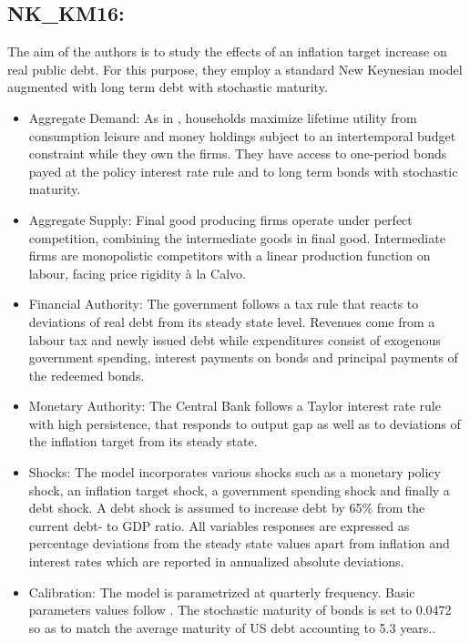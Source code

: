 \documentclass[11pt,a4paper]{article}
\begin{document}
	
	
	\subsection{NK\_KM16: \texorpdfstring{\cite{krause2016public}}{Krause and Moyen (2016)}}
	\label{NKKM16}
	The aim of the authors is to study the effects of an inflation target increase on real public debt. For this purpose, they employ a standard New Keynesian model augmented with long term debt with stochastic maturity.
	
	\begin{itemize}
		\item Aggregate Demand: As in \cite{RotembergWoodford1997}, households maximize lifetime utility from consumption leisure and money holdings subject to an intertemporal budget constraint while they own the firms. They have access to one-period bonds payed at the policy interest rate rule and to long term bonds with stochastic maturity.
		
		\item Aggregate Supply: Final good producing firms operate under perfect competition, combining the intermediate goods in final good. Intermediate firms are monopolistic competitors with a linear production function on labour, facing price rigidity \`{a} la Calvo.
		
		\item Financial Authority: The government follows a tax rule that reacts to deviations of real debt from its steady state level. Revenues come from a labour tax and newly issued debt while expenditures consist of exogenous government spending, interest payments on bonds and principal payments of the redeemed bonds.
		
		\item Monetary Authority: The Central Bank follows a Taylor interest rate rule with high persistence, that responds to output gap as well as to deviations of the inflation target from its steady state.
		
		\item Shocks: The model incorporates various shocks such as a monetary policy shock, an inflation target shock, a government spending shock and finally a debt shock. A debt shock is assumed to increase debt by 65\% from the current debt- to GDP ratio. All variables responses are expressed as percentage deviations from the steady state values apart from inflation and interest rates which are reported in annualized absolute deviations.
		
		\item Calibration: The model is parametrized at quarterly frequency. Basic parameters values follow \cite{SmetsWouters2007}. The stochastic maturity of bonds is set to 0.0472 so as to match the average maturity of US debt accounting to 5.3 years..
		
		
	\end{itemize}
	
\end{document}
